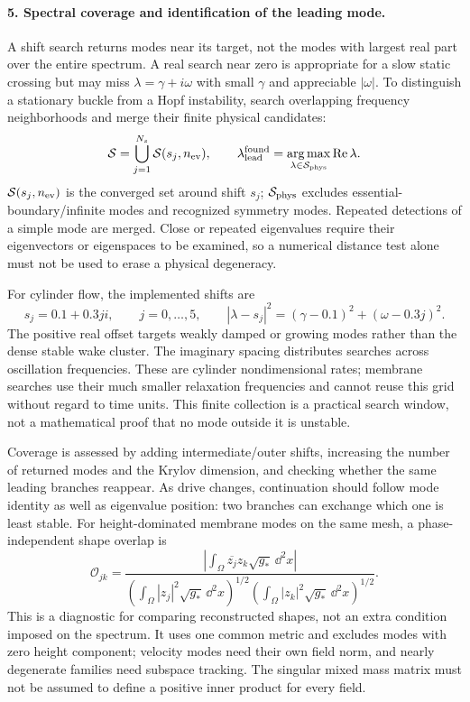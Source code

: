 \paragraph{5. Spectral coverage and identification of the leading mode.}
A shift search returns modes near its target, not the modes with largest real part over the entire spectrum. A real search near zero is appropriate for a slow static crossing but may miss $\lambda=\gamma+i\omega$ with small $\gamma$ and appreciable $|\omega|$. To distinguish a stationary buckle from a Hopf instability, search overlapping frequency neighborhoods and merge their finite physical candidates:
\begin{equation}
\mathcal S=\bigcup_{j=1}^{N_s}\mathcal S(s_j,n_{\rm ev}),
\qquad
\lambda_{\rm lead}^{\rm found}
=\operatorname*{arg\,max}_{\lambda\in\mathcal S_{\rm phys}}\operatorname{Re}\lambda.
\label{eq:spectral-candidate-union}
\end{equation}
$\mathcal S(s_j,n_{\rm ev})$ is the converged set around shift $s_j$; $\mathcal S_{\rm phys}$ excludes essential-boundary/infinite modes and recognized symmetry modes. Repeated detections of a simple mode are merged. Close or repeated eigenvalues require their eigenvectors or eigenspaces to be examined, so a numerical distance test alone must not be used to erase a physical degeneracy.

For cylinder flow, the implemented shifts are
\begin{equation}
s_j=0.1+0.3ji,\qquad j=0,\ldots,5,
\qquad |\lambda-s_j|^2=(\gamma-0.1)^2+(\omega-0.3j)^2.
\label{eq:cylinder-shift-grid}
\end{equation}
The positive real offset targets weakly damped or growing modes rather than the dense stable wake cluster. The imaginary spacing distributes searches across oscillation frequencies. These are cylinder nondimensional rates; membrane searches use their much smaller relaxation frequencies and cannot reuse this grid without regard to time units. This finite collection is a practical search window, not a mathematical proof that no mode outside it is unstable.

Coverage is assessed by adding intermediate/outer shifts, increasing the number of returned modes and the Krylov dimension, and checking whether the same leading branches reappear. As drive changes, continuation should follow mode identity as well as eigenvalue position: two branches can exchange which one is least stable. For height-dominated membrane modes on the same mesh, a phase-independent shape overlap is
\begin{equation}
\mathcal O_{jk}=
\frac{\left|\int_\Omega\overline{z_j}z_k\sqrt{g_*}\,\dd^2x\right|}
{\left(\int_\Omega|z_j|^2\sqrt{g_*}\,\dd^2x\right)^{1/2}
 \left(\int_\Omega|z_k|^2\sqrt{g_*}\,\dd^2x\right)^{1/2}}.
\label{eq:mode-overlap}
\end{equation}
This is a diagnostic for comparing reconstructed shapes, not an extra condition imposed on the spectrum. It uses one common metric and excludes modes with zero height component; velocity modes need their own field norm, and nearly degenerate families need subspace tracking. The singular mixed mass matrix must not be assumed to define a positive inner product for every field.

